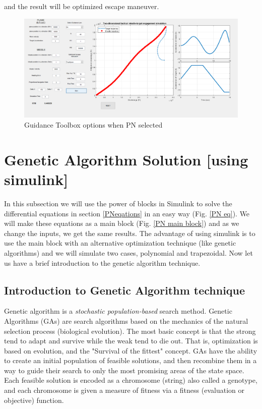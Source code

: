 and the result will be optimized escape maneuver. 

\begin{figure}[H]
	\centering
	\includegraphics[scale = 0.4]{fig/guiPN.PNG}
	\caption{Guidance Toolbox options when PN selected}
	\label{Guidance Toolbox PN}
\end{figure}
  


\section{Genetic Algorithm Solution [using simulink]}


In this subsection we will use the power of blocks in Simulink to solve the differential equations in section \ref{PNeqations} in an easy way (Fig. \ref{PN eq}). We will make these equations as a main block (Fig. \ref{PN main block}) and as we change the inputs, we get the same results. The advantage of using simulink is to use the main block with an alternative optimization technique (like genetic algorithms) and we will simulate two cases, polynomial and trapezoidal. Now let us have a brief introduction to the genetic algorithm technique.

\subsection{Introduction to Genetic Algorithm technique}
Genetic algorithm is a \textit{stochastic population-based} search method. Genetic Algorithms (GAs) are   search algorithms based on the mechanics of the natural selection process (biological evolution).  The most basic concept is that the strong tend to adapt and survive while the weak tend to die out. That is, optimization is based on evolution, and the "Survival of the fittest" concept.
GAs have the ability to create an initial population of feasible solutions, and then recombine them in a way to guide their search to only the most promising areas of the state space.   
Each feasible solution is encoded as a chromosome (string) also called a genotype, and each chromosome is given a measure of fitness via a fitness (evaluation or objective) function. 

